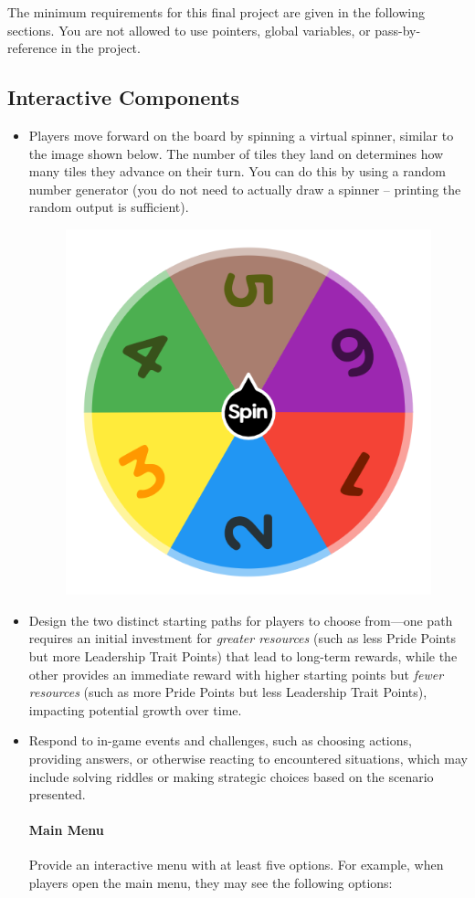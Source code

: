 The minimum requirements for this final project are given in the following sections. You are not allowed to use pointers, global variables, or pass-by-reference in the project. 


\subsection{Interactive Components}
\begin{itemize}
            \item Players move forward on the board by spinning a virtual spinner, similar to the image shown below. The number of tiles they land on determines how many tiles they advance on their turn. You can do this by using a random number generator (you do not need to actually draw a spinner -- printing the random output is sufficient).
\begin{figure}[h!]
    \centering
    \includegraphics[width=0.5\linewidth]{images/spinner.png}
\end{figure}
            \item Design the two distinct starting paths for players to choose from—one path requires an initial investment for  \textit{greater resources} (such as less Pride Points but more Leadership Trait Points) that lead to long-term rewards, while the other provides an immediate reward with higher starting points but \textit{fewer resources} (such as more Pride Points but less Leadership Trait Points), impacting potential growth over time.  
            \item Respond to in-game events and challenges, such as choosing actions, providing answers, or otherwise reacting to encountered situations, which may include solving riddles or making strategic choices based on the scenario presented. 

\paragraph{Main Menu}
Provide an interactive menu with at least five options. For example, when players open the main menu, they may see the following options: 
\end{itemize}

